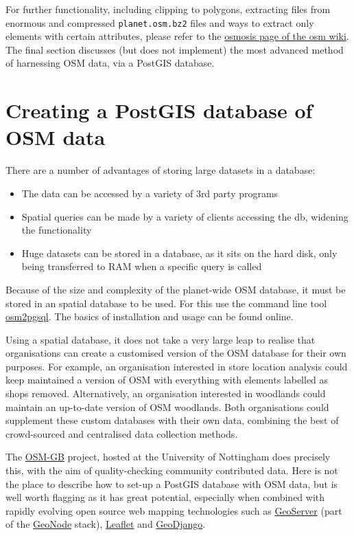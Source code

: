 \documentclass[]{article}
\begin{document}
For further functionality, including clipping to polygons, extracting
files from enormous and compressed \texttt{planet.osm.bz2} files and
ways to extract only elements with certain attributes, please refer to
the \href{http://wiki.openstreetmap.org/wiki/Osmosis}{osmosis page of
the osm wiki}. The final section discusses (but does not implement) the
most advanced method of harnessing OSM data, via a PostGIS database.

\section{Creating a PostGIS database of OSM data}

There are a number of advantages of storing large datasets in a
database:

\begin{itemize}
\item
  The data can be accessed by a variety of 3rd party programs
\item
  Spatial queries can be made by a variety of clients accessing the db,
  widening the functionality
\item
  Huge datasets can be stored in a database, as it sits on the hard
  disk, only being transferred to RAM when a specific query is called
\end{itemize}

Because of the size and complexity of the planet-wide OSM database, it
must be stored in an spatial database to be used. For this use the
command line tool
\href{http://wiki.openstreetmap.org/wiki/Osm2pgsql}{osm2pgsql}. The
basics of installation and usage can be found online.

Using a spatial database, it does not take a very large leap to realise
that organisations can create a customised version of the OSM database
for their own purposes. For example, an organisation interested in store
location analysis could keep maintained a version of OSM with everything
with elements labelled as shops removed. Alternatively, an organisation
interested in woodlands could maintain an up-to-date version of OSM
woodlands. Both organisations could supplement these custom databases
with their own data, combining the best of crowd-sourced and centralised
data collection methods.

The \href{http://wiki.openstreetmap.org/wiki/Osm2pgsql}{OSM-GB} project,
hosted at the University of Nottingham does precisely this, with the aim
of quality-checking community contributed data. Here is not the place to
describe how to set-up a PostGIS database with OSM data, but is well
worth flagging as it has great potential, especially when combined with
rapidly evolving open source web mapping technologies such as
\href{http://geoserver.org/display/GEOS/Welcome}{GeoServer} (part of the
\href{http://geonode.org/}{GeoNode} stack),
\href{http://leafletjs.com/}{Leaflet} and
\href{https://www.djangoproject.com/}{GeoDjango}.
\end{document}
